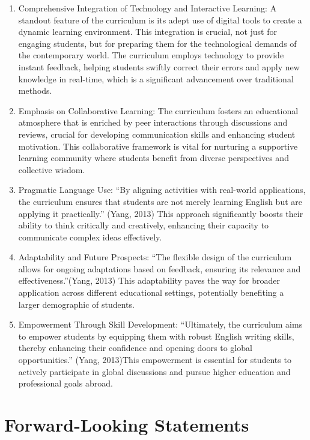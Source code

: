 \documentclass[11pt]{article}
\begin{document}
\begin{enumerate}
  \item Comprehensive Integration of Technology and Interactive Learning: A standout feature of the curriculum is its adept use of digital tools to create a dynamic learning environment. This integration is crucial, not just for engaging students, but for preparing them for the technological demands of the contemporary world. The curriculum employs technology to provide instant feedback, helping students swiftly correct their errors and apply new knowledge in real-time, which is a significant advancement over traditional methods.
  \item Emphasis on Collaborative Learning: The curriculum fosters an educational atmosphere that is enriched by peer interactions through discussions and reviews, crucial for developing communication skills and enhancing student motivation. This collaborative framework is vital for nurturing a supportive learning community where students benefit from diverse perspectives and collective wisdom.
  \item Pragmatic Language Use: ``By aligning activities with real-world applications, the curriculum ensures that students are not merely learning English but are applying it practically.'' (Yang, 2013) This approach significantly boosts their ability to think critically and creatively, enhancing their capacity to communicate complex ideas effectively.
  \item Adaptability and Future Prospects: ``The flexible design of the curriculum allows for ongoing adaptations based on feedback, ensuring its relevance and effectiveness.''(Yang, 2013) This adaptability paves the way for broader application across different educational settings, potentially benefiting a larger demographic of students.
  \item Empowerment Through Skill Development: ``Ultimately, the curriculum aims to empower students by equipping them with robust English writing skills, thereby enhancing their confidence and opening doors to global opportunities.'' (Yang, 2013)This empowerment is essential for students to actively participate in global discussions and pursue higher education and professional goals abroad.
\end{enumerate}

\section{Forward-Looking Statements}
\end{document}
